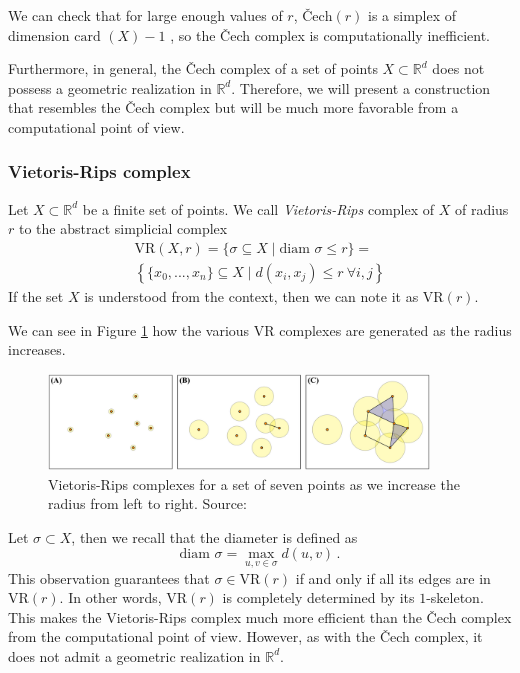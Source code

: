 \documentclass[../main.tex]{subfiles}
\begin{document}
We can check that for large enough values of $r$, $\text{\v{C}ech}(r)$ is a simplex of dimension $\text{card }(X)-1$ {\cite[Chapter~3]{edelsbrunner_computational_2010}}, so the \v{C}ech complex is computationally inefficient.

Furthermore, in general, the \v{C}ech complex of a set of points $X \subset \mathbb{R}^d$ does not possess a geometric realization in $\mathbb{R}^d$. Therefore, we will present a construction that resembles the \v{C}ech complex but will be much more favorable from a computational point of view.

\subsubsection*{Vietoris-Rips complex}

\begin{definition}
Let $X \subset \mathbb{R}^d$ be a finite set of points. We call \emph{Vietoris-Rips} complex of $X$ of radius $r$ to the abstract simplicial complex 
\begin{gather*}
\text{VR}(X, r) = \{\sigma \subseteq  X \mid \textrm{diam } \sigma \leq r\} =\\
\left\{ \{x_0, ..., x_n\} \subseteq  X \mid d(x_i, x_j) \leq r\ \forall i,j\right\} 
\end{gather*}
If the set $X$ is understood from the context, then we can note it as $\text{VR}(r)$.
\end{definition}

We can see in Figure \ref{fig:vr} how the various VR complexes are generated as the radius increases.

\begin{figure}[!ht]
\centering
\includegraphics[width=0.9\textwidth]{figures/bg/vr.png} 
\caption{Vietoris-Rips complexes for a set of seven points as we increase the radius from left to right. Source: \cite{ulmer_topological_2019}}
\label{fig:vr}
\end{figure}


Let $\sigma \subset X$, then we recall that the diameter is defined as
\[\textrm{diam } \sigma = \max_{u,v \in \sigma} d(u,v)\,.\]
This observation guarantees that $\sigma \in \text{VR}(r)$ if and only if all its edges are in $\text{VR}(r)$. In other words, $\text{VR}(r)$ is completely determined by its $1$-skeleton. This makes the Vietoris-Rips complex much more efficient than the \v{C}ech complex from the computational point of view. However, as with the \v{C}ech complex, it does not admit a geometric realization in $\mathbb{R}^d$.
\end{document}

